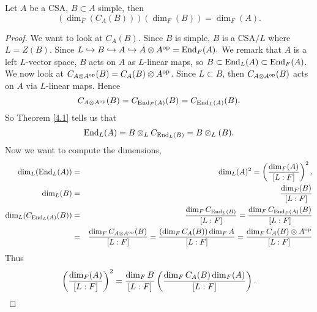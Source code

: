 \begin{theorem}\label{3.4}
Let $A$ be a CSA, $B \subset A$ simple, then 
$$(\dim_F(C_A(B)))(\dim_F(B)) = \dim_F(A).$$
\end{theorem}
\begin{proof}
We want to look at $C_A(B)$. Since $B$ is simple, $B$ is a CSA$/L$ where $L = Z(B)$. Since $L \hookrightarrow B \hookrightarrow A \hookrightarrow A\otimes A^{\operatorname{op}} = \operatorname{End}_F(A).$ We remark that $A$ is a left $L$-vector space, $B$ acts on $A$ as $L$-linear maps, so $B \subset \operatorname{End}_L(A) \subset \operatorname{End}_F(A)$. We now look at 
$C_{A\otimes A^{\operatorname{op}}}(B) = C_A(B) \otimes A^{\operatorname{op}}$. Since $L \subset B$, then $C_{A \otimes A^{\operatorname{op}}}(B)$ acts on $A$ via $L$-linear maps. Hence $$C_{A \otimes A^{\operatorname{op}}}(B) = C_{\operatorname{End}_F(A)}(B) = C_{\operatorname{End}_L(A)}(B).$$
So Theorem \ref{4.1} tells us that 
$$\operatorname{End}_L(A) = B \otimes_L C_{\operatorname{End}_L(B)} = B \otimes_L (B).$$
Now we want to compute the dimensions,
\begin{eqnarray*}
\dim_L(\operatorname{End}_L(A)) &=& \dim_L(A)^2 = \left( \frac{\dim_F(A)}{[L:F]} \right)^2,\\
\dim_L(B) &=& \frac{\dim_F(B)}{[L:F]} \\
\dim_L(C_{\operatorname{End}_L(A)}(B)) &=&  \frac{\dim_FC_{\operatorname{End}_L(B)}}{[L:F]} = \frac{\dim_F C_{\operatorname{End}_F(A)}(B)}{[L:F]} \\ &= &\frac{\dim_{F}C_{A\otimes A^{\operatorname{op}}}(B)}{[L:F]} = \frac{(\dim_FC_A(B))\dim_FA}{[L:F]} = \frac{\dim_FC_A(B) \otimes A^{\operatorname{op}}}{[L:F]}
\end{eqnarray*}
Thus 
$$\left( \frac{\dim_F(A)}{[L:F]} \right)^2 = \frac{\dim_FB}{[L:F]}\left( \frac{\dim_FC_A(B)\dim_F(A)}{[L:F]} \right).$$


\end{proof}
